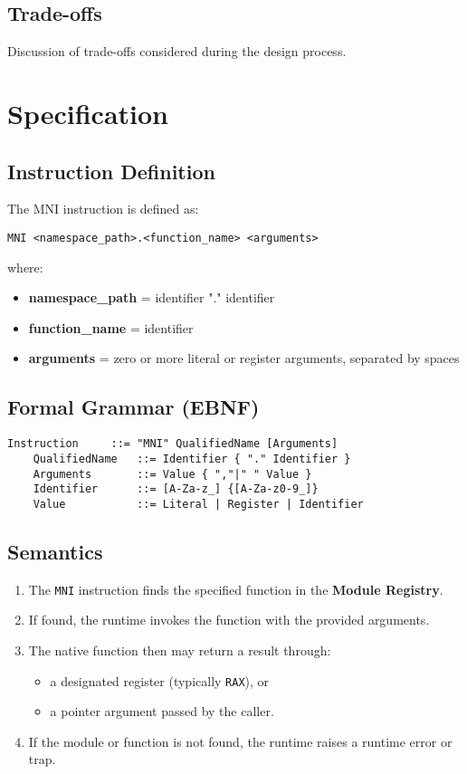 \documentclass[11pt]{article}
\begin{document}
	\subsection{Trade-offs}
	Discussion of trade-offs considered during the design process.
	
	\section{Specification}

	\subsection{Instruction Definition}
	The MNI instruction is defined as:

	\begin{lstlisting}[language=MicroASM]
	MNI <namespace_path>.<function_name> <arguments>
	\end{lstlisting}

	where:
	\begin{itemize}
		\item \textbf{namespace\_path} = identifier {"." identifier}
		\item \textbf{function\_name} = identifier
		\item \textbf{arguments} = zero or more literal or register arguments, separated by spaces
	\end{itemize}

	\subsection{Formal Grammar (EBNF)}
	\begin{lstlisting}[language=MicroASM]
	Instruction     ::= "MNI" QualifiedName [Arguments]
	QualifiedName   ::= Identifier { "." Identifier }
	Arguments       ::= Value { ","|" " Value }
	Identifier      ::= [A-Za-z_] {[A-Za-z0-9_]}
	Value           ::= Literal | Register | Identifier
	\end{lstlisting}

	\subsection{Semantics}
	\begin{enumerate}
		\item The \texttt{MNI} instruction finds the specified function in the \textbf{Module Registry}.
		\item If found, the runtime invokes the function with the provided arguments.
		\item The native function then may return a result through:
		\begin{itemize}
			\item a designated register (typically \texttt{RAX}), or
			\item a pointer argument passed by the caller.
		\end{itemize}
		\item If the module or function is not found, the runtime raises a runtime error or trap.
	\end{enumerate}
\end{document}
